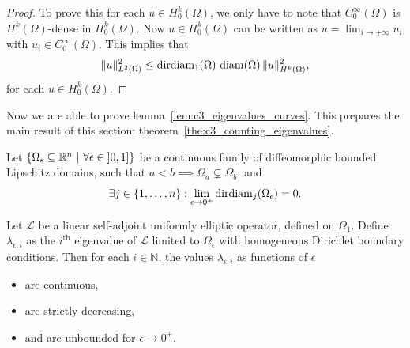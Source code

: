 \begin{proof}
  To prove this for each $u \in H_0^k(\Omega)$, we only have to note that
  $C^\infty_0(\Omega)$ is $H^k(\Omega)$-dense in $H^k_0(\Omega)$. Now $u \in H_0^k(\Omega)$ can be written as $u = \lim_{i \to +\infty} u_i$ with $u_i \in C^\infty_0(\Omega)$. This implies that
  $$\|u\|_{L^2(\Omega)}^2 \leq \operatorname{dirdiam}_1(\Omega) \, \operatorname{diam}(\Omega) \, \| u \|^2_{H^k(\Omega)}\text{,}$$
  for each $u \in H_0^k(\Omega)$.
\end{proof}

Now we are able to prove lemma~\ref{lem:c3_eigenvalues_curves}. This prepares the main result of this section: theorem~\ref{the:c3_counting_eigenvalues}.

\begin{lemma}\label{lem:c3_eigenvalues_curves}
  Let $\left\{\Omega_\epsilon \subseteq \RR^n \ | \ \forall \epsilon \in \left]0, 1\right]\right\}$ be a continuous family of diffeomorphic bounded Lipschitz domains, such that $ a < b \implies \Omega_a \subsetneq \Omega_b $, and
  $$
    \exists j\in\{1,\dots, n\} : \lim_{\epsilon \to 0^{+}} \operatorname{dirdiam}_j(\Omega_\epsilon) = 0\text{.}
  $$

  Let $\mathcal{L}$ be a linear self-adjoint uniformly elliptic operator, defined on $\Omega_1$. Define $\lambda_{\epsilon,i}$ as the $i^\text{th}$ eigenvalue of $\mathcal{L}$ limited to $\Omega_\epsilon$ with homogeneous Dirichlet boundary conditions. Then for each $i \in \mathbb{N}$, the values $\lambda_{\epsilon,i}$ as functions of $\epsilon$
  \begin{itemize}
    \item are continuous,
    \item are strictly decreasing,
    \item and are unbounded for $\epsilon \to 0^{+}$.
  \end{itemize}
\end{lemma}

